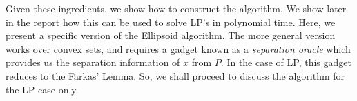 \documentclass[conference]{IEEEtran}
\begin{document}
Given these ingredients, we show how to construct the algorithm.  We show later
in the report how this can be used to solve LP's in polynomial time. Here, we
present a specific version of the Ellipsoid algorithm. The more general version
works over convex sets, and requires a gadget known as a \textit{separation
oracle} which provides us the separation information of $x$ from $P$. In the
case of LP, this gadget reduces to the Farkas' Lemma. So, we shall proceed to
discuss the algorithm for the LP case only.

\begin{figure}
    \\

\end{figure}
\end{document}
